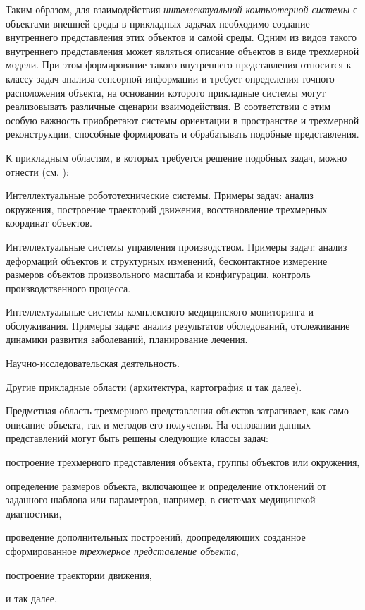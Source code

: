 Таким образом, для взаимодействия \textit{интеллектуальной компьютерной системы} с объектами внешней среды в прикладных задачах необходимо создание внутреннего представления этих объектов и самой среды. Одним из видов такого внутреннего представления может являться описание объектов в виде трехмерной модели. При этом формирование такого внутреннего представления относится к классу задач анализа сенсорной информации и требует определения точного расположения объекта, на основании которого прикладные системы могут реализовывать различные сценарии взаимодействия. В соответствии с этим особую важность приобретают системы ориентации в пространстве и трехмерной реконструкции, способные формировать и обрабатывать подобные представления.

К прикладным областям, в которых требуется решение подобных задач, можно отнести (см. ):
\begin{textitemize}
    \item Интеллектуальные робототехнические системы. Примеры задач: анализ окружения, построение траекторий движения, восстановление трехмерных координат объектов.
    \item Интеллектуальные системы управления производством.  Примеры задач: анализ деформаций объектов и структурных изменений, бесконтактное измерение размеров объектов произвольного масштаба и конфигурации, контроль производственного процесса.
    \item Интеллектуальные системы комплексного медицинского мониторинга и обслуживания. Примеры задач: анализ результатов обследований, отслеживание динамики развития заболеваний, планирование лечения.
    \item Научно-исследовательская деятельность.
    \item Другие прикладные области (архитектура, картография и так далее).
\end{textitemize}

Предметная область трехмерного представления объектов затрагивает, как само описание объекта, так и методов его получения. На основании данных представлений могут быть решены следующие классы задач:

\begin{textitemize}
    \item построение трехмерного представления объекта, группы объектов или окружения,
    \item определение размеров объекта, включающее и определение отклонений от заданного шаблона или параметров, например, в системах медицинской диагностики,
    \item проведение дополнительных построений, доопределяющих созданное сформированное \textit{трехмерное представление объекта},
    \item построение траектории движения,
    \item и так далее.
\end{textitemize}

